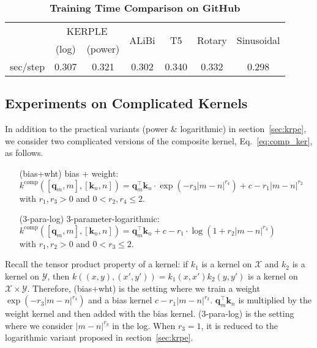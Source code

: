 \begin{table}[!ht]
    \centering
    \caption{\textbf{Training Time Comparison on GitHub}}
    \begin{tabular}{lcccccc}
    \hline\hline
     & \multicolumn{2}{c}{KERPLE} & \multirow{2}{*}{ALiBi} & \multirow{2}{*}{T5} & \multirow{2}{*}{Rotary} & \multirow{2}{*}{Sinusoidal}\\
      \cline{2-3}
     &   (log) & (power) &  &  &  & \\ \hline
    sec/step & 0.307 & 0.321 & 0.302 & 0.340 & 0.332 & 0.298 \\ 
    \hline\hline
    \end{tabular}
    \label{tab:speed}
\end{table}

\subsection{Experiments on Complicated Kernels}
\label{sec:ablation}
In addition to the practical variants (power \& logarithmic) in section~\ref{sec:krpe}, we consider two complicated versions of the composite kernel, Eq.~\eqref{eq:comp_ker}, as follows.
\begin{enumerate}[topsep=-3pt, itemsep=-1pt, leftmargin=20mm]
    \item[(bias+wht)] bias + weight:\\
    $k^{\text{comp}}([\bm q_m,m],[\bm k_n,n])= \bm q_m^\top \bm k_n\cdot \exp(-r_3|m-n|^{r_4}) + c-r_1|m-n|^{r_2}$\\ 
    with $r_1,r_3>0$ and $0<r_2,r_4\leq 2$.
    \item[(3-para-log)] 3-parameter-logarithmic:\\
    $k^{\text{comp}}([\bm q_m,m],[\bm k_n,n])= \bm q_m^\top \bm k_n+c-r_1\cdot \log(1+r_2|m-n|^{r_3})$\\
    with $r_1,r_2>0$ and $0<r_3\leq 2$.
\end{enumerate}
Recall the tensor product property of a kernel: if $k_1$ is a kernel on $\mathcal{X}$ and $k_2$ is a kernel on $\mathcal{Y}$, then $k((x,y),(x',y'))=k_1(x,x')k_2(y,y')$ is a kernel on $\mathcal{X}\times \mathcal{Y}$. Therefore, (bias+wht) is the setting where we train a weight $\exp(-r_3|m-n|^{r_4})$ and a bias kernel $c-r_1|m-n|^{r_2}$. $\bm q_m^\top \bm k_n$ is multiplied by the weight kernel and then added with the bias kernel. (3-para-log) is the setting where we consider $|m-n|^{r_3}$ in the log. When $r_3=1$, it is reduced to the logarithmic variant proposed in section~\ref{sec:krpe}.

